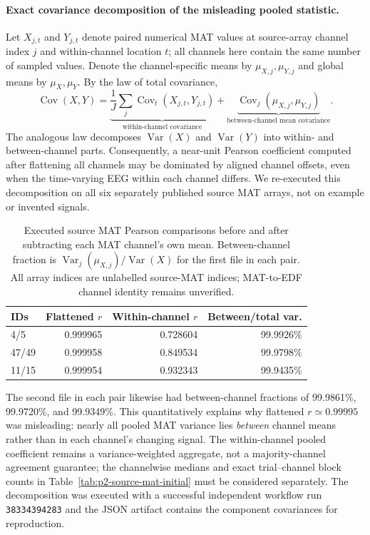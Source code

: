 \paragraph{Exact covariance decomposition of the misleading pooled statistic.}
Let $X_{j,t}$ and $Y_{j,t}$ denote paired numerical
MAT values at source-array channel index $j$ and
within-channel location $t$; all channels here
contain the same number of sampled values.
Denote the channel-specific means by
$\mu_{X,j},\mu_{Y,j}$ and global means
by $\mu_X,\mu_Y$. By the law of
total covariance,
\[
\operatorname{Cov}(X,Y)
=\underbrace{\frac1J\sum_j
 \operatorname{Cov}_{t}(X_{j,t},Y_{j,t})}
 _{\text{within-channel covariance}}
+\underbrace{\operatorname{Cov}_{j}
 (\mu_{X,j},\mu_{Y,j})}
 _{\text{between-channel mean covariance}}.
\]
The analogous law decomposes
$\operatorname{Var}(X)$ and
$\operatorname{Var}(Y)$ into within- and
between-channel parts. Consequently,
a near-unit Pearson coefficient computed after
flattening all channels may be dominated
by aligned channel offsets, even when the
time-varying EEG within each channel differs.
We re-executed this decomposition on all
six separately published source MAT arrays,
not on example or invented signals.

\begin{table}[tb]
\centering\small
\caption{Executed source MAT Pearson comparisons
before and after subtracting each MAT channel's
own mean. Between-channel fraction is
$\operatorname{Var}_j(\mu_{X,j})/
\operatorname{Var}(X)$ for the first file
in each pair. All array indices are
unlabelled source-MAT indices; MAT-to-EDF
channel identity remains unverified.}
\label{tab:p2-source-mat-covariance}
\setlength{\tabcolsep}{3.5pt}
\begin{tabular}{lrrr}
\toprule
IDs & Flattened $r$ & Within-channel $r$
 & Between/total var.\\
\midrule
4/5   & 0.999965 & 0.728604 & 99.9926\%\\
47/49 & 0.999958 & 0.849534 & 99.9798\%\\
11/15 & 0.999954 & 0.932343 & 99.9435\%\\
\bottomrule
\end{tabular}
\end{table}
The second file in each pair likewise had
between-channel fractions of
99.9861\%, 99.9720\%, and 99.9349\%.
This quantitatively explains why
flattened $r\simeq0.99995$ was misleading:
nearly all pooled MAT variance lies
\emph{between} channel means rather than
in each channel's changing signal.
The within-channel pooled coefficient
remains a variance-weighted aggregate,
not a majority-channel agreement
guarantee; the channelwise medians and
exact trial--channel block counts in
Table~\ref{tab:p2-source-mat-initial}
must be considered separately.
The decomposition was executed with a
successful independent workflow run
\texttt{38334394283} and
the JSON artifact contains the component
covariances for reproduction.


